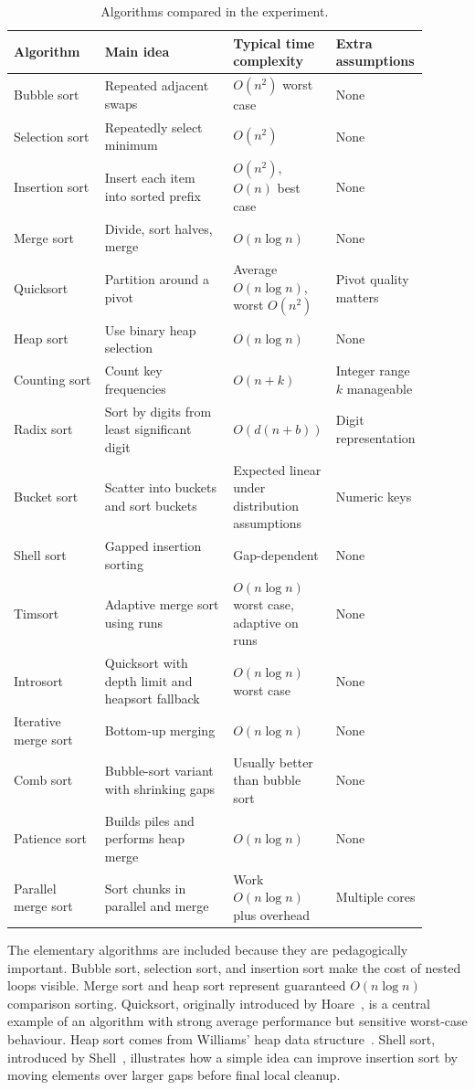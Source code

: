 \documentclass[11pt,a4paper]{article}
\begin{document}
\begin{table}[H]
\centering
\caption{Algorithms compared in the experiment.}
\label{tab:algorithms}
\small
\begin{tabular}{p{0.22\linewidth}p{0.31\linewidth}p{0.23\linewidth}p{0.14\linewidth}}
\toprule
Algorithm & Main idea & Typical time complexity & Extra assumptions \\
\midrule
Bubble sort & Repeated adjacent swaps & $O(n^2)$ worst case & None \\
Selection sort & Repeatedly select minimum & $O(n^2)$ & None \\
Insertion sort & Insert each item into sorted prefix & $O(n^2)$, $O(n)$ best case & None \\
Merge sort & Divide, sort halves, merge & $O(n\log n)$ & None \\
Quicksort & Partition around a pivot & Average $O(n\log n)$, worst $O(n^2)$ & Pivot quality matters \\
Heap sort & Use binary heap selection & $O(n\log n)$ & None \\
Counting sort & Count key frequencies & $O(n+k)$ & Integer range $k$ manageable \\
Radix sort & Sort by digits from least significant digit & $O(d(n+b))$ & Digit representation \\
Bucket sort & Scatter into buckets and sort buckets & Expected linear under distribution assumptions & Numeric keys \\
Shell sort & Gapped insertion sorting & Gap-dependent & None \\
Timsort & Adaptive merge sort using runs & $O(n\log n)$ worst case, adaptive on runs & None \\
Introsort & Quicksort with depth limit and heapsort fallback & $O(n\log n)$ worst case & None \\
Iterative merge sort & Bottom-up merging & $O(n\log n)$ & None \\
Comb sort & Bubble-sort variant with shrinking gaps & Usually better than bubble sort & None \\
Patience sort & Builds piles and performs heap merge & $O(n\log n)$ & None \\
Parallel merge sort & Sort chunks in parallel and merge & Work $O(n\log n)$ plus overhead & Multiple cores \\
\bottomrule
\end{tabular}
\end{table}

The elementary algorithms are included because they are pedagogically important. Bubble sort, selection sort, and insertion sort make the cost of nested loops visible. Merge sort and heap sort represent guaranteed $O(n\log n)$ comparison sorting. Quicksort, originally introduced by Hoare~\cite{hoare1962}, is a central example of an algorithm with strong average performance but sensitive worst-case behaviour. Heap sort comes from Williams' heap data structure~\cite{williams1964}. Shell sort, introduced by Shell~\cite{shell1959}, illustrates how a simple idea can improve insertion sort by moving elements over larger gaps before final local cleanup.
\end{document}
